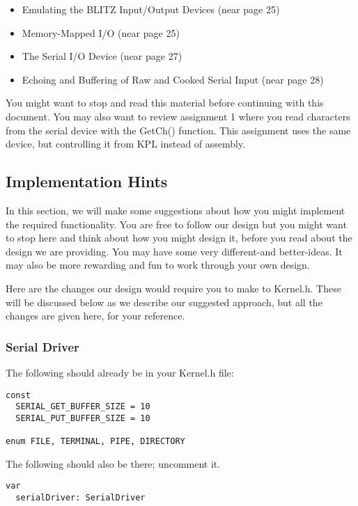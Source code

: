 \documentclass[11pt]{article}
\begin{document}
\begin{itemize}
\item  Emulating the BLITZ Input/Output Devices (near page 25)
\item  Memory-Mapped I/O (near page 25)
\item  The Serial I/O Device (near page 27)
\item  Echoing and Buffering of Raw and Cooked Serial Input (near page 28)
\end{itemize}
  
You might want to stop and read this material before continuing with
this document.  You may also want to review assignment 1 where you
read characters from the serial device with the GetCh() function.
This assignment uses the same device, but controlling it from KPL
instead of assembly.

\subsection{Implementation Hints}

In this section, we will make some suggestions about how you might
implement the required functionality.  You are free to follow our
design but you might want to stop here and think about how you might
design it, before you read about the design we are providing.  You may
have some very different-and better-ideas.  It may also be more
rewarding and fun to work through your own design.

Here are the changes our design would require you to make to Kernel.h.
These will be discussed below as we describe our suggested approach,
but all the changes are given here, for your reference.

\subsubsection{Serial Driver}

The following should already be in your Kernel.h file:

\begin{verbatim}
const
  SERIAL_GET_BUFFER_SIZE = 10
  SERIAL_PUT_BUFFER_SIZE = 10

enum FILE, TERMINAL, PIPE, DIRECTORY
\end{verbatim}

The following should also be there; uncomment it.

\begin{verbatim}
var
  serialDriver: SerialDriver
\end{verbatim}
\end{document}
